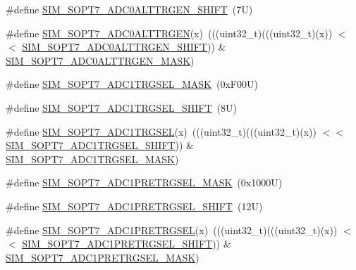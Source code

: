 \begin{DoxyCompactItemize}
\item 
\#define \mbox{\hyperlink{group___s_i_m___register___masks_gaa20ed5f5ab9cf02714a993c3996adcc5}{S\+I\+M\+\_\+\+S\+O\+P\+T7\+\_\+\+A\+D\+C0\+A\+L\+T\+T\+R\+G\+E\+N\+\_\+\+S\+H\+I\+FT}}~(7\+U)
\item 
\#define \mbox{\hyperlink{group___s_i_m___register___masks_gaa6e4ac1e062d8dbe841774255a1c04e9}{S\+I\+M\+\_\+\+S\+O\+P\+T7\+\_\+\+A\+D\+C0\+A\+L\+T\+T\+R\+G\+EN}}(x)~(((uint32\+\_\+t)(((uint32\+\_\+t)(x)) $<$$<$ \mbox{\hyperlink{group___s_i_m___register___masks_gaa20ed5f5ab9cf02714a993c3996adcc5}{S\+I\+M\+\_\+\+S\+O\+P\+T7\+\_\+\+A\+D\+C0\+A\+L\+T\+T\+R\+G\+E\+N\+\_\+\+S\+H\+I\+FT}})) \& \mbox{\hyperlink{group___s_i_m___register___masks_ga6390cd75db35ecc6c5fc6d5b0d417a7d}{S\+I\+M\+\_\+\+S\+O\+P\+T7\+\_\+\+A\+D\+C0\+A\+L\+T\+T\+R\+G\+E\+N\+\_\+\+M\+A\+SK}})
\item 
\#define \mbox{\hyperlink{group___s_i_m___register___masks_ga1c262a802f5341d2b3f9e3750fec1244}{S\+I\+M\+\_\+\+S\+O\+P\+T7\+\_\+\+A\+D\+C1\+T\+R\+G\+S\+E\+L\+\_\+\+M\+A\+SK}}~(0x\+F00\+U)
\item 
\#define \mbox{\hyperlink{group___s_i_m___register___masks_ga41e9a42e300b2132d8877fb9a01a6fa1}{S\+I\+M\+\_\+\+S\+O\+P\+T7\+\_\+\+A\+D\+C1\+T\+R\+G\+S\+E\+L\+\_\+\+S\+H\+I\+FT}}~(8\+U)
\item 
\#define \mbox{\hyperlink{group___s_i_m___register___masks_ga5ee178887262b7141316f662e3d8a629}{S\+I\+M\+\_\+\+S\+O\+P\+T7\+\_\+\+A\+D\+C1\+T\+R\+G\+S\+EL}}(x)~(((uint32\+\_\+t)(((uint32\+\_\+t)(x)) $<$$<$ \mbox{\hyperlink{group___s_i_m___register___masks_ga41e9a42e300b2132d8877fb9a01a6fa1}{S\+I\+M\+\_\+\+S\+O\+P\+T7\+\_\+\+A\+D\+C1\+T\+R\+G\+S\+E\+L\+\_\+\+S\+H\+I\+FT}})) \& \mbox{\hyperlink{group___s_i_m___register___masks_ga1c262a802f5341d2b3f9e3750fec1244}{S\+I\+M\+\_\+\+S\+O\+P\+T7\+\_\+\+A\+D\+C1\+T\+R\+G\+S\+E\+L\+\_\+\+M\+A\+SK}})
\item 
\#define \mbox{\hyperlink{group___s_i_m___register___masks_gad5a05f77e88118ff1b5c02e4a756f527}{S\+I\+M\+\_\+\+S\+O\+P\+T7\+\_\+\+A\+D\+C1\+P\+R\+E\+T\+R\+G\+S\+E\+L\+\_\+\+M\+A\+SK}}~(0x1000\+U)
\item 
\#define \mbox{\hyperlink{group___s_i_m___register___masks_ga8cf171203a65ae7c3842b32a90562558}{S\+I\+M\+\_\+\+S\+O\+P\+T7\+\_\+\+A\+D\+C1\+P\+R\+E\+T\+R\+G\+S\+E\+L\+\_\+\+S\+H\+I\+FT}}~(12\+U)
\item 
\#define \mbox{\hyperlink{group___s_i_m___register___masks_ga9ac945e4a293bb1ba5c19ffc8b19a25f}{S\+I\+M\+\_\+\+S\+O\+P\+T7\+\_\+\+A\+D\+C1\+P\+R\+E\+T\+R\+G\+S\+EL}}(x)~(((uint32\+\_\+t)(((uint32\+\_\+t)(x)) $<$$<$ \mbox{\hyperlink{group___s_i_m___register___masks_ga8cf171203a65ae7c3842b32a90562558}{S\+I\+M\+\_\+\+S\+O\+P\+T7\+\_\+\+A\+D\+C1\+P\+R\+E\+T\+R\+G\+S\+E\+L\+\_\+\+S\+H\+I\+FT}})) \& \mbox{\hyperlink{group___s_i_m___register___masks_gad5a05f77e88118ff1b5c02e4a756f527}{S\+I\+M\+\_\+\+S\+O\+P\+T7\+\_\+\+A\+D\+C1\+P\+R\+E\+T\+R\+G\+S\+E\+L\+\_\+\+M\+A\+SK}})
$$
\end{DoxyCompactItemize}

